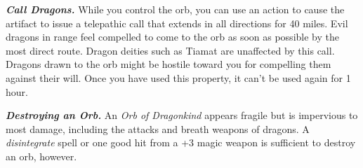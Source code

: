 \documentclass[
]{article}
\begin{document}
\emph{\textbf{Call Dragons.}} While you control the orb, you can use an
action to cause the artifact to issue a telepathic call that extends in
all directions for 40 miles. Evil dragons in range feel compelled to
come to the orb as soon as possible by the most direct route. Dragon
deities such as Tiamat are unaffected by this call. Dragons drawn to the
orb might be hostile toward you for compelling them against their will.
Once you have used this property, it can't be used again for 1 hour.

\emph{\textbf{Destroying an Orb.}} An \emph{Orb of Dragonkind} appears
fragile but is impervious to most damage, including the attacks and
breath weapons of dragons. A \emph{disintegrate} spell or one good hit
from a +3 magic weapon is sufficient to destroy an orb, however.
\end{document}
